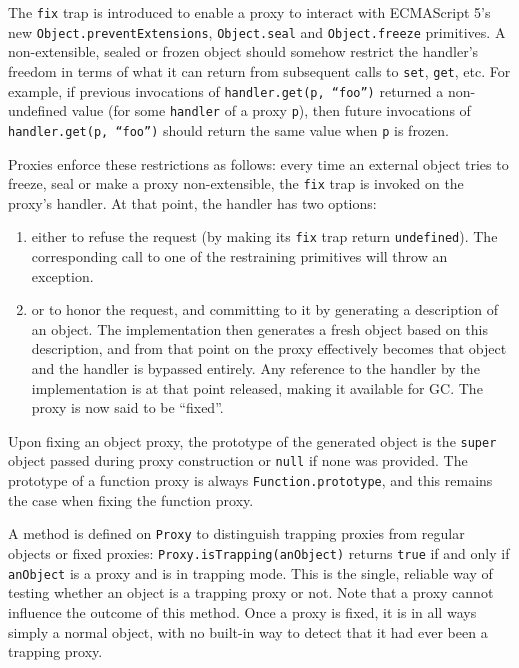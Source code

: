 \documentclass{acm_proc_article-sp}
\begin{document}
The \texttt{fix} trap is introduced to enable a proxy to interact with ECMAScript 5's new \texttt{Object.preventExtensions}, \texttt{Object.seal} and \texttt{Object.freeze} primitives. A non-extensible, sealed or frozen object should somehow restrict the handler’s freedom in terms of what it can return from subsequent calls to \texttt{set}, \texttt{get}, etc. For example, if previous invocations of \texttt{handler.get(p, ``foo'')} returned a non-undefined value (for some \texttt{handler} of a proxy \texttt{p}), then future invocations of \texttt{handler.get(p, ``foo'')} should return the same value when \texttt{p} is frozen.

Proxies enforce these restrictions as follows: every time an external object tries to freeze, seal or make a proxy non-extensible, the \texttt{fix} trap is invoked on the proxy’s handler. At that point, the handler has two options:
\begin{enumerate}
  \item either to refuse the request (by making its \texttt{fix} trap return \texttt{undefined}). The corresponding call to one of the restraining primitives will throw an exception.
  \item or to honor the request, and committing to it by generating a description of an object. The implementation then generates a fresh object based on this description, and from that point on the proxy effectively becomes that object and the handler is bypassed entirely. Any reference to the handler by the implementation is at that point released, making it available for GC. The proxy is now said to be ``fixed''.  
\end{enumerate}

Upon fixing an object proxy, the prototype of the generated object is the \texttt{super} object passed during proxy construction or \texttt{null} if none was provided. The prototype of a function proxy is always \texttt{Function.prototype}, and this remains the case when fixing the function proxy.


A method is defined on \texttt{Proxy} to distinguish trapping proxies from regular objects or fixed proxies:
\texttt{Proxy.isTrapping(anObject)} returns \texttt{true} if and only if \texttt{anObject} is a proxy and is in trapping mode. This is the single, reliable way of testing whether an object is a trapping proxy or not. Note that a proxy cannot influence the outcome of this method. Once a proxy is fixed, it is in all ways simply a normal object, with no built-in way to detect that it had ever been a trapping proxy.
\end{document}

